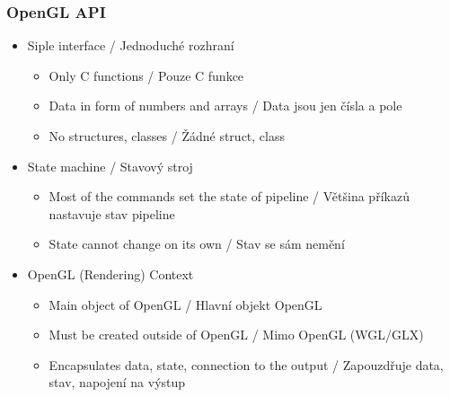 \begin{frame}\frametitle{OpenGL API}
\scriptsize
\begin{itemize}
  \item Siple interface / Jednoduché rozhraní
    \begin{itemize}\scriptsize
      \item Only C functions / Pouze C funkce
      \item Data in form of numbers and arrays / Data jsou jen čísla a pole
      \item No structures, classes / Žádné struct, class
    \end{itemize}
  \item State machine / Stavový stroj
    \begin{itemize}\scriptsize
      \item Most of the commands set the state of pipeline / Většina příkazů nastavuje stav pipeline
      \item State cannot change on its own / Stav se sám nemění
    \end{itemize}
  \item OpenGL (Rendering) Context
    \begin{itemize}\scriptsize
      \item Main object of OpenGL / Hlavní objekt OpenGL
      \item Must be created outside of OpenGL / Mimo OpenGL (WGL/GLX)
      \item Encapsulates data, state, connection to the output / Zapouzdřuje data, stav, napojení na výstup
    \end{itemize}
\end{itemize}
\end{frame}

